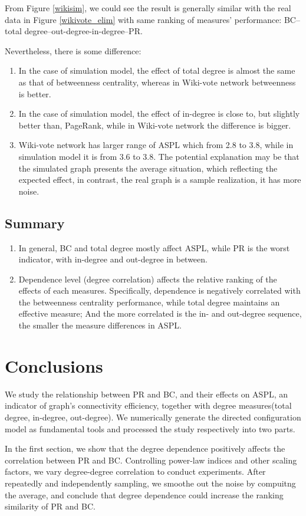 \documentclass{article}
\begin{document}
\begin{enumerate}
From Figure \ref{wikisim},  we could see the result is generally similar with the real data in Figure \ref{wikivote_elim} with same ranking of measures' performance: BC--total degree--out-degree-in-degree--PR.
\par Nevertheless, there is some difference:
\begin{enumerate}
\item  In the case of simulation model, the effect of total degree is almost the same as that of betweenness centrality, whereas in Wiki-vote network betweenness is better.
\item In the case of simulation model, the effect of in-degree is close to, but slightly better than, PageRank, while in Wiki-vote network the difference is bigger.
\item Wiki-vote network has larger range of ASPL which from 2.8 to 3.8, while in simulation model it is from 3.6 to 3.8. The potential explanation may be that the simulated graph presents the average situation, which reflecting the expected effect, in contrast, the real graph is a sample realization, it has more noise.
\end{enumerate}

\end{enumerate}

\subsection{Summary}
\begin{enumerate}
\item In general, BC and total degree mostly affect ASPL, while PR is the worst indicator, with in-degree and out-degree in between.
\item Dependence level (degree correlation) affects the relative ranking of the effects of each measures. Specifically, dependence is negatively correlated with the betweenness centrality performance, while total degree maintains an effective measure; And the more correlated is the in- and out-degree sequence, the smaller the measure differences in ASPL.
\end{enumerate}


\section{Conclusions}
\quad
\par We study the relationship between PR and BC, and their effects on ASPL, an indicator of graph's connectivity efficiency, together with degree measures(total degree, in-degree, out-degree). We numerically generate the directed configuration model as fundamental tools and processed the study respectively into two parts.
\par In the first section, we show that the degree dependence positively affects the correlation between PR and BC. Controlling power-law indices and other scaling factors, we vary degree-degree correlation to conduct experiments. After repeatedly and independently sampling, we smoothe out the noise by compuitng the average, and conclude that degree dependence could increase the ranking similarity of PR and BC. \\
 
\end{document}
